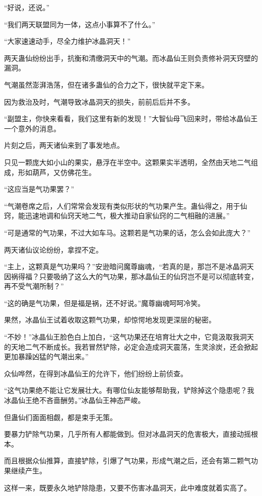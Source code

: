 \begin{this_body}
“好说，还说。”

“我们两天联盟同为一体，这点小事算不了什么。”

“大家速速动手，尽全力维护冰晶洞天！”

两天蛊仙纷纷出手，抗衡和清缴洞天中的气潮。而冰晶仙王则负责修补洞天窍壁的漏洞。

气潮虽然澎湃浩荡，但在诸多蛊仙的合力之下，很快就平定下来。

因为救治及时，气潮导致冰晶洞天的损失，前前后后并不多。

“副盟主，你快来看看，我们这里有新的发现！”大智仙母飞回来时，带给冰晶仙王一个意外的消息。

片刻之后，两天诸仙来到了事发地点。

只见一颗庞大如小山的果实，悬浮在半空中。这颗果实半透明，全然由天地二气组成，形如葫芦，又仿佛花生。

“这应当是气功果罢？”

“气潮卷席之后，人们常常会发现有类似形状的气功果产生。蛊仙得之，用于仙窍，能迅速地调和仙窍天地二气，极大推动自家仙窍的二气相融的进展。”

“可是通常的气功果，不过大如车马。这颗若是气功果的话，怎么会如此庞大？”

两天诸仙议论纷纷，拿捏不定。

“主上，这颗真是气功果吗？”安逊暗问魔尊幽魂，“若真的是，那岂不是冰晶洞天因祸得福？只要吸纳了这么大的气功果，那冰晶仙王的仙窍岂不是可以彻底转变，再不受气潮所制？”

“这的确是气功果，但是福是祸，还不好说。”魔尊幽魂呵呵冷笑。

果然，冰晶仙王试着收取这颗气功果，却惊愕地发现更深层的秘密。

“不妙！”冰晶仙王脸色白上加白，“这气功果还在培育壮大之中，它竟汲取我洞天的天地二气不断成长。我若冒然铲除，必定会造成洞天震荡，生灵涂炭，还会掀起更加暴躁凶猛的气潮出来。”

众仙哗然，在得到冰晶仙王的允许下，他们纷纷上前侦查。

“这气功果绝不能让它发展壮大。有哪位仙友能够帮助我，铲除掉这个隐患呢？我冰晶仙王绝不吝啬酬劳。”冰晶仙王神态严峻。

但蛊仙们面面相觑，都是束手无策。

要暴力铲除气功果，几乎所有人都能做到。但对冰晶洞天的危害极大，直接动摇根本。

而且根据众仙推算，直接铲除，引爆了气功果，形成气潮之后，还会有第二颗气功果继续产生。

这样一来，既要永久地铲除隐患，又要不伤害冰晶洞天，此中难度就着实高了。


\end{this_body}
